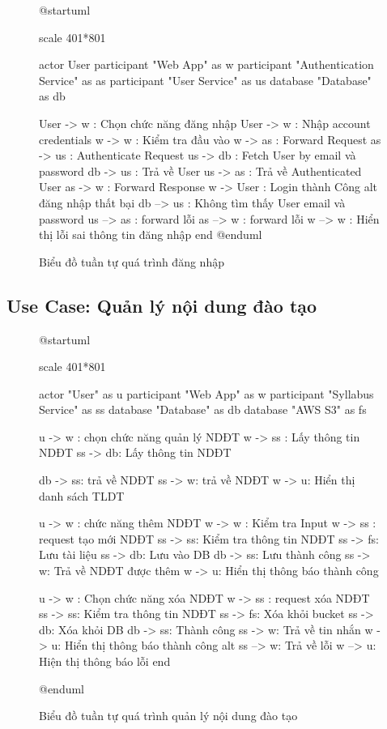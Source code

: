 \documentclass[report.tex]{subfiles}
\begin{document}
\begin{figure}[!ht]
\caption{Biểu đồ tuần tự quá trình đăng nhập}
\begin{plantuml}

@startuml

scale 401*801

actor User
participant "Web App" as w
participant "Authentication Service" as as
participant "User Service" as us
database "Database" as db

User -> w : Chọn chức năng đăng nhập
User -> w : Nhập account credentials
w -> w : Kiểm tra đầu vào
w -> as : Forward Request
as -> us : Authenticate Request
us -> db : Fetch User by email và password
db -> us : Trả về User
us -> as : Trả về Authenticated User
as -> w : Forward Response
w -> User : Login thành Công
alt đăng nhập thất bại
  db --> us : Không tìm thấy User email và password
  us --> as : forward lỗi
  as --> w : forward lỗi
  w --> w : Hiển thị lỗi sai thông tin đăng nhập
end
@enduml
\end{plantuml}
\end{figure}
\FloatBarrier

\subsection{Use Case: Quản lý nội dung đào tạo}

\begin{figure}[!ht]
\caption{Biểu đồ tuần tự quá trình quản lý nội dung đào tạo}
\begin{plantuml}

@startuml

scale 401*801

actor "User" as u
participant "Web App" as w
participant "Syllabus Service" as ss
database "Database" as db
database "AWS S3" as fs

u -> w : chọn chức năng quản lý NDĐT
w -> ss : Lấy thông tin NDĐT
ss -> db: Lấy thông tin NDĐT

db -> ss: trả về NDĐT
ss -> w: trả về NDĐT
w -> u: Hiển thị danh sách TLDT

u -> w : chức năng thêm NDĐT
w -> w : Kiểm tra Input
w -> ss : request tạo mới NDĐT
ss -> ss: Kiểm tra thông tin NDĐT
ss -> fs: Lưu tài liệu
ss -> db: Lưu vào DB
db -> ss: Lưu thành công
ss -> w: Trả về NDĐT được thêm
w -> u: Hiển thị thông báo thành công

u -> w : Chọn chức năng xóa NDĐT
w -> ss : request xóa NDĐT
ss -> ss: Kiểm tra thông tin NDĐT
ss -> fs: Xóa khỏi bucket
ss -> db: Xóa khỏi DB
db -> ss: Thành công
ss -> w: Trả về tin nhắn
w -> u: Hiển thị thông báo thành công
alt
  ss --> w: Trả về lỗi
  w --> u: Hiện thị thông báo lỗi
end

@enduml
\end{plantuml}
\end{figure}
\FloatBarrier
\end{document}
